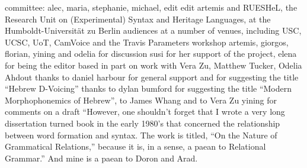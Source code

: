 \addchap{\lsAcknowledgementTitle} 

committee: alec, maria, stephanie, michael, edit
edit
artemis and RUESHeL, the Research Unit on (Experimental) Syntax and Heritage Languages, at the Humboldt-Universit\"at zu Berlin
audiences at a number of venues, including USC, UCSC, UoT, CamVoice and the Travis Parameters workshop
artemis, giorgos, florian, yining and odelia for discussion
susi for her support of the project, elena for being the editor
based in part on work with Vera Zu, Matthew Tucker, Odelia Ahdout
thanks to daniel harbour for general support and for suggesting the title ``Hebrew D-Voicing''
thanks to dylan bumford for suggesting the title ``Modern Morphophonemics of Hebrew'', to James Whang and to Vera Zu
yining for comments on a draft
``However, one shouldn’t forget that I wrote a very long dissertation turned book in the early 1980’s that concerned the relationship between word formation and syntax. The work is titled, “On the Nature of Grammatical Relations,” because it is, in a sense, a paean to Relational Grammar.'' And mine is a paean to Doron and Arad.